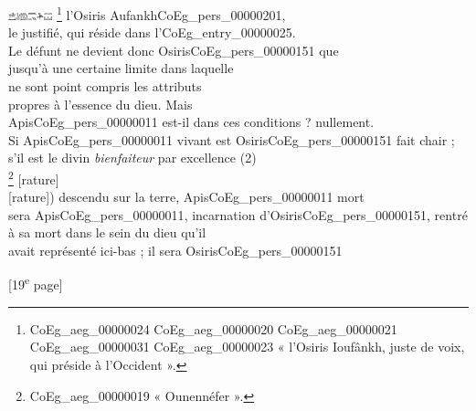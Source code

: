 \documentclass{book}
\begin{document}
{\begin{paracol}{2}
\includegraphics[height=6pt]{CoEg_Mariette_hiero_1857-04-01_18_1_2.png} \footnote{\foreignlanguage{translit}{\gls{CoEg_aeg_00000024} \gls{CoEg_aeg_00000020} \gls{CoEg_aeg_00000021} \gls{CoEg_aeg_00000031} \gls{CoEg_aeg_00000023}} « l'Osiris Ioufânkh, juste de voix, qui préside à l'Occident ».} l’Osiris Aufankh\gls{CoEg_pers_00000201},\\
le justifié, qui réside dans l’\gls{CoEg_entry_00000025}.\\
Le défunt ne devient donc Osiris\gls{CoEg_pers_00000151} que\\
jusqu’à une certaine limite dans laquelle\\
ne sont point compris les attributs\\
propres à l’essence du dieu. Mais\\
Apis\gls{CoEg_pers_00000011} est-il dans ces conditions ? nullement.\\
Si Apis\gls{CoEg_pers_00000011} vivant est Osiris\gls{CoEg_pers_00000151} fait chair ;\\
s’il est le divin \textit{bienfaiteur} par excellence (2)\\
\footnote{\foreignlanguage{translit}{\gls{CoEg_aeg_00000019}} « Ounennéfer ».} {[rature]}\\
{[rature]}) descendu sur la terre, Apis\gls{CoEg_pers_00000011} mort\\
sera Apis\gls{CoEg_pers_00000011}, incarnation d’Osiris\gls{CoEg_pers_00000151}, rentré\\
à sa mort dans le sein du dieu qu’il\\
avait représenté ici-bas ; il sera Osiris\gls{CoEg_pers_00000151}
\end{paracol}

{\footnotesize\begin{center} {[19\textsuperscript{e} page]}\end{center}}

}
\end{document}
